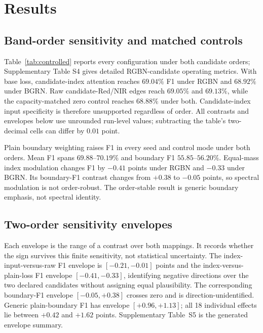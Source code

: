 \section{Results}
\label{sec:results}

\subsection{Band-order sensitivity and matched controls}

\begin{table}[htbp]
\centering
\caption{Three-seed means under release-supported RGBN and conservative
native-order BGRN sensitivity. BF1 uses one-pixel Chebyshev tolerance.}
\label{tab:controlled}

\end{table}

Table~\ref{tab:controlled} reports every configuration under both candidate
orders; Supplementary Table S4 gives detailed RGBN-candidate operating metrics.
With base loss, candidate-index attention reaches $69.04\%$ F1 under
RGBN and $68.92\%$ under BGRN. Raw candidate-Red/NIR edges reach $69.05\%$ and
$69.13\%$, while the capacity-matched zero control reaches $68.88\%$ under
both. Candidate-index input specificity is therefore unsupported regardless
of order.
All contrasts and envelopes below use unrounded run-level values; subtracting
the table's two-decimal cells can differ by $0.01$ point.

Plain boundary weighting raises F1 in every seed and control mode under both
orders. Mean F1 spans $69.88$--$70.19\%$ and boundary F1
$55.85$--$56.20\%$. Equal-mass index modulation changes F1 by $-0.41$ points
under RGBN and $-0.33$ under BGRN. Its boundary-F1 contrast changes from
$+0.38$ to $-0.05$ points, so spectral modulation is not order-robust. The
order-stable result is generic boundary emphasis, not spectral identity.

\subsection{Two-order sensitivity envelopes}

Each envelope is the range of a contrast over both mappings. It records whether
the sign survives this finite sensitivity, not statistical uncertainty.
The index-input-versus-raw F1 envelope is $[-0.21,-0.01]$ points and the
index-versus-plain-loss F1 envelope $[-0.41,-0.33]$, identifying negative
directions over the two declared candidates without assigning equal
plausibility. The corresponding boundary-F1
envelope $[-0.05,+0.38]$ crosses zero and is direction-unidentified. Generic
plain-boundary F1 has envelope $[+0.96,+1.13]$; all 18 individual effects lie
between $+0.42$ and $+1.62$ points. Supplementary Table~S5 is the generated
envelope summary.

